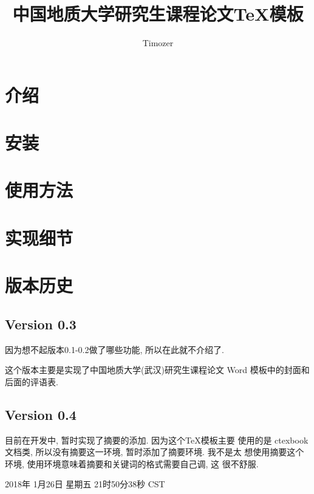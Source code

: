 \documentclass{cugrep}
\title{中国地质大学研究生课程论文\TeX{}模板}
\author{Timozer}
\begin{document}
\maketitle
\frontmatter
{}
\makeabstract 
\tableofcontents
\clearpage
\mainmatter

\chapter{介绍}


\chapter{安装}

\chapter{使用方法}

\chapter{实现细节}

\chapter{版本历史}

\section{Version 0.3}
\label{sec:version_0_3}
因为想不起版本0.1-0.2做了哪些功能, 所以在此就不介绍了.

这个版本主要是实现了中国地质大学(武汉)研究生课程论文 Word 模板中的封面和后面的评语表.
\section{Version 0.4}
\label{sec:version_0_4}

目前在开发中, 暂时实现了摘要的添加. 因为这个\TeX{}模板主要 使用的是
ctexbook 文档类, 所以没有摘要这一环境, 暂时添加了摘要环境. 我不是太
想使用摘要这个环境, 使用环境意味着摘要和关键词的格式需要自己调, 这
很不舒服.

2018年 1月26日 星期五 21时50分38秒 CST
\end{document}
